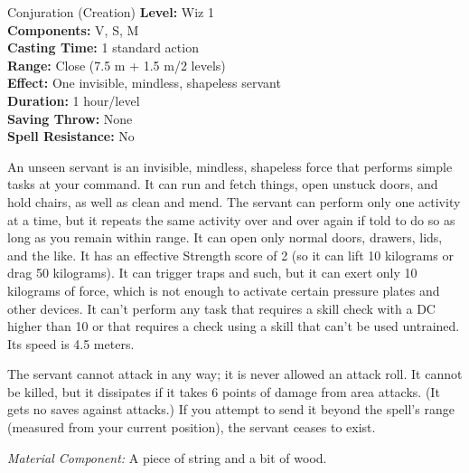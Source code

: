 {Conjuration (Creation)}
{
	\textbf{Level:}
	Wiz 1\\
	\textbf{Components:}
	V, S, M\\
	\textbf{Casting Time:}
	1 standard action\\
	\textbf{Range:}
	Close (7.5 m + 1.5 m/2 levels)\\
	\textbf{Effect:}
	One invisible, mindless, shapeless servant\\
	\textbf{Duration:}
	1 hour/level\\
	\textbf{Saving Throw:}
	None\\
	\textbf{Spell Resistance:}
	No\\
}
{
	An unseen servant is an invisible, mindless, shapeless force that performs simple tasks at your command. It can run and fetch things, open unstuck doors, and hold chairs, as well as clean and mend. The servant can perform only one activity at a time, but it repeats the same activity over and over again if told to do so as long as you remain within range. It can open only normal doors, drawers, lids, and the like. It has an effective Strength score of 2 (so it can lift 10 kilograms or drag 50 kilograms). It can trigger traps and such, but it can exert only 10 kilograms of force, which is not enough to activate certain pressure plates and other devices. It can't perform any task that requires a skill check with a DC higher than 10 or that requires a check using a skill that can't be used untrained. Its speed is 4.5 meters.

	The servant cannot attack in any way; it is never allowed an attack roll. It cannot be killed, but it dissipates if it takes 6 points of damage from area attacks. (It gets no saves against attacks.) If you attempt to send it beyond the spell's range (measured from your current position), the servant ceases to exist.

	\textit{Material Component:}
	A piece of string and a bit of wood.

}
